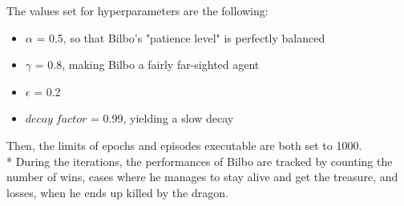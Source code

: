 The values set for hyperparameters are the following:
\begin{itemize}
  \item $\alpha$ = 0.5, so that Bilbo's "patience level" is perfectly balanced
  \item $\gamma$ = 0.8, making Bilbo a fairly far-sighted agent 
  \item $\epsilon$ = 0.2
  \item $decay\;factor$ = 0.99, yielding a slow decay
\end{itemize} 
Then, the limits of epochs and episodes executable are both set to 1000.\\*
During the iterations, the performances of Bilbo are tracked by counting the number of wins, cases where he manages to stay alive and get the treasure, and losses, when he ends up killed by the dragon.

